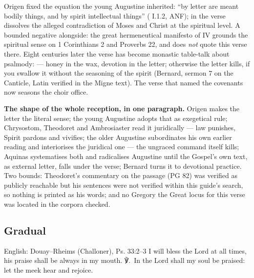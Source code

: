 \begin{witnessnote}
Origen fixed the equation the young Augustine inherited: ``by letter are
meant bodily things, and by spirit intellectual things'' ( I.1.2, ANF); in  the verse dissolves the
alleged contradiction of Moses and Christ at the spiritual level. A bounded
negative alongside: the great hermeneutical manifesto of 
IV grounds the spiritual sense on 1 Corinthians 2 and Proverbs 22, and does
\textit{not} quote this verse there. Eight centuries later the verse has
become monastic table-talk about psalmody:  --- honey in the wax, devotion in the letter; otherwise the letter
kills, if you swallow it without the seasoning of the spirit (Bernard,
sermon 7 on the Canticle, Latin verified in the Migne text). The verse that
named the covenants now seasons the choir office.
\end{witnessnote}

\textbf{The shape of the whole reception, in one paragraph.} Origen makes the
letter the literal sense; the young Augustine adopts that as exegetical rule;
Chrysostom, Theodoret and Ambrosiaster read it juridically --- law punishes,
Spirit pardons and vivifies; the older Augustine subordinates his own earlier
reading and interiorises the juridical one --- the ungraced command itself
kills; Aquinas systematises both and radicalises Augustine until the Gospel's
own text, as external letter, falls under the verse; Bernard turns it to
devotional practice. Two bounds: Theodoret's commentary on the passage (PG
82) was verified as publicly reachable but his sentences were not verified
within this guide's search, so nothing is printed as his words; and no
Gregory the Great locus for this verse was located in the corpora checked.

\elementguard
\subsection*{Gradual }


\begin{namedtranslation}{English: Douay--Rheims (Challoner), Ps. 33:2--3}
I will bless the Lord at all times, his praise shall be always in my mouth.
℣.~In the Lord shall my soul be praised: let the meek hear and rejoice.
\end{namedtranslation}

